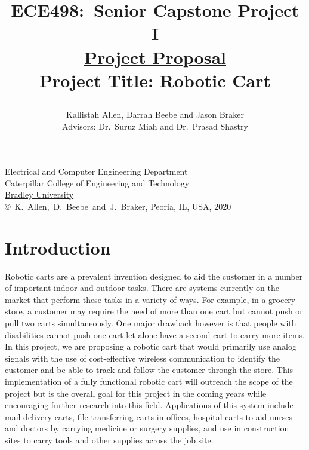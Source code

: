 \documentclass[letterpaper,12pt]{article}   %
\title{ECE498:~Senior Capstone Project I\\\textbf{\underline{Project Proposal}}\\
\vspace{0.5in}
Project Title: Robotic Cart
\vspace{1.0in}
\author{Kallistah Allen, Darrah Beebe and Jason Braker\\ Advisors: Dr.~Suruz Miah and Dr.~Prasad Shastry}
}
\date{}  %
\begin{document}
\begin{titlepage}
 \maketitle

\vspace*{4.0cm}
\begin{center}
\normalsize
Electrical and Computer Engineering Department\\
Caterpillar College of Engineering and Technology\\
\href{http://www.bradley.edu/}{Bradley University}\\

\vspace*{6.0cm}
\copyright~K.~Allen,~D.~Beebe~and~J.~Braker, Peoria, IL, USA, 2020\\

\end{center}
\thispagestyle{empty}

\end{titlepage} 
\newpage
\renewcommand{\contentsname}{Table of Contents}
\tableofcontents
\newpage

\section{Introduction}
Robotic carts are a prevalent invention designed to aid the customer in a number of important indoor and outdoor tasks. There are systems currently on the market that perform these tasks in a variety of ways. For example, in a grocery store, a customer may require the need of more than one cart but cannot push or pull two carts simultaneously. One major drawback however is that people with disabilities cannot push one cart let alone have a second cart to carry more items. In this project, we are proposing a robotic cart that would primarily use analog signals with the use of cost-effective wireless communication to identify the customer and be able to track and follow the customer through the store. This implementation of a fully functional robotic cart will outreach the scope of the project but is the overall goal for this project in the coming years while encouraging further research into this field. Applications of this system include mail delivery carts, file transferring carts in offices, hospital carts to aid nurses and doctors by carrying medicine or surgery supplies, and use in construction sites to carry tools and other supplies across the job site.
\end{document}
